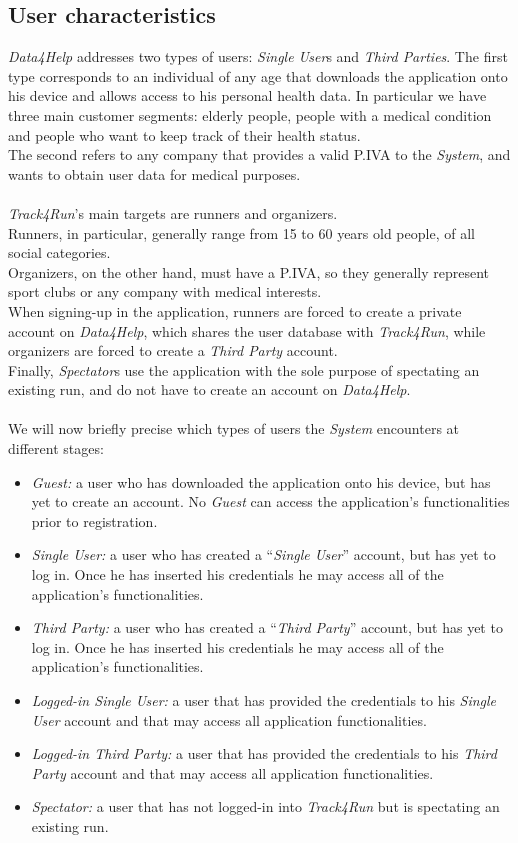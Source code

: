 \documentclass[titlepage]{article}
\begin{document}
	\subsection{User characteristics}
	{\it Data4Help} addresses two types of users: {\it Single User}s and {\it Third Parties}. 
The first type corresponds to an individual of any age that downloads the application onto his device and allows access to his personal health data. In particular we have three main customer segments: elderly people, people with a medical condition and people who want to keep track of their health status. \\
The second refers to any company that provides a valid P.IVA to the {\it System}, and wants to obtain user data for medical purposes.\\
\\
{\it Track4Run}’s main targets are runners and organizers.\\
Runners, in particular, generally range from 15 to 60 years old people, of all social categories. \\
Organizers, on the other hand, must have a P.IVA, so they generally represent sport clubs or any company with medical interests.\\
When signing-up in the application, runners are forced to create a private account on {\it Data4Help}, which shares the user database with {\it Track4Run}, while organizers are forced to create a {\it Third Party} account.\\
Finally, {\it Spectator}s use the application with the sole purpose of spectating an existing run, and do not have to create an account on {\it Data4Help}.\\
\\
We will now briefly precise which types of users the {\it System} encounters at different stages:
\begin{itemize}
	\item{\it {\it Guest}: } a user who has downloaded the application onto his device, but has yet to create an account. No {\it Guest} can access the application’s functionalities prior to registration.
	\item {\it {\it Single User}: } a user who has created a “{\it Single User}” account, but has yet to log in. Once he has inserted his credentials he may access all of the application’s functionalities. 
	\item {\it {\it Third Party}: } a user who has created a “{\it Third Party}” account, but has yet to log in. Once he has inserted his credentials he may access all of the application’s functionalities.
	\item {\it Logged-in {\it Single User}: } a user that has provided the credentials to his {\it Single User} account and that may access all application functionalities.
	\item {\it Logged-in {\it Third Party}: } a user that has provided the credentials to his {\it Third Party} account and that may access all application functionalities.
	\item {\it {\it Spectator}: } a user that has not logged-in into {\it Track4Run} but is spectating an existing run. 
\end{itemize}	
\end{document}
